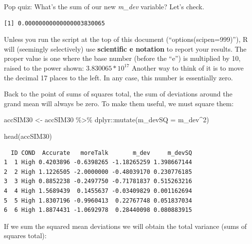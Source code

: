 \documentclass[
  11pt,
]{book}
\newenvironment{Shaded}{\begin{snugshade}}{\end{snugshade}}
\newcommand{\AttributeTok}[1]{\textcolor[rgb]{0.77,0.63,0.00}{#1}}
\newcommand{\DecValTok}[1]{\textcolor[rgb]{0.00,0.00,0.81}{#1}}
\newcommand{\FunctionTok}[1]{\textcolor[rgb]{0.00,0.00,0.00}{#1}}
\newcommand{\NormalTok}[1]{#1}
\newcommand{\OtherTok}[1]{\textcolor[rgb]{0.56,0.35,0.01}{#1}}
\newcommand{\SpecialCharTok}[1]{\textcolor[rgb]{0.00,0.00,0.00}{#1}}
\begin{document}
Pop quiz: What's the sum of our new \emph{m\_dev} variable? Let's check.

\begin{Shaded}
\end{Shaded}

\begin{verbatim}
[1] 0.00000000000000003830065
\end{verbatim}

Unless you run the script at the top of this document (``options(scipen=999)''), R will (seemingly selectively) use \textbf{scientific e notation} to report your results. The proper value is one where the base number (before the ``e'') is multiplied by 10, raised to the power shown: \(3.830065 * 10^{17}\) Another way to think of it is to move the decimal 17 places to the left. In any case, this number is essentially zero.

Back to the point of sums of squares total, the sum of deviations around the grand mean will always be zero. To make them useful, we must square them:

\begin{Shaded}
\begin{Highlighting}[]
\NormalTok{accSIM30 }\OtherTok{\textless{}{-}}\NormalTok{ accSIM30 }\SpecialCharTok{\%\textgreater{}\%} 
\NormalTok{  dplyr}\SpecialCharTok{::}\FunctionTok{mutate}\NormalTok{(}\AttributeTok{m\_devSQ =}\NormalTok{ m\_dev}\SpecialCharTok{\^{}}\DecValTok{2}\NormalTok{)}

\FunctionTok{head}\NormalTok{(accSIM30)}
\end{Highlighting}
\end{Shaded}

\begin{verbatim}
  ID COND  Accurate   moreTalk       m_dev     m_devSQ
1  1 High 0.4203896 -0.6398265 -1.18265259 1.398667144
2  2 High 1.1226505 -2.0000000 -0.48039170 0.230776185
3  3 High 0.8852238 -0.2497750 -0.71781837 0.515263216
4  4 High 1.5689439  0.1455637 -0.03409829 0.001162694
5  5 High 1.8307196 -0.9960413  0.22767748 0.051837034
6  6 High 1.8874431 -1.0692978  0.28440098 0.080883915
\end{verbatim}

If we sum the squared mean deviations we will obtain the total variance (sums of squares total):
\end{document}
